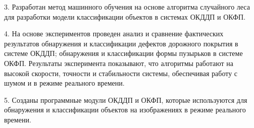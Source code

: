 \documentclass[a4paper,14pt]{extreport}
\begin{document}
3.	Разработан метод машинного обучения на основе алгоритма случайного леса для разработки модели классификации объектов в системах ОКДДП и ОКФП.

4.	На основе экспериментов проведен анализ и сравнение фактических результатов обнаружения и классификации дефектов дорожного покрытия в системе ОКДДП; обнаружения и классификации формы пузырьков в системе ОКФП. Результаты эксперимента показывают, что алгоритмы работают на высокой скорости, точности и стабильности системы, обеспечивая работу с шумом и в режиме реального времени.

5.	Созданы программные модули ОКДДП и ОКФП, которые используются для обнаружения и классификации объектов на изображениях в режиме реального времени.



\end{document}
